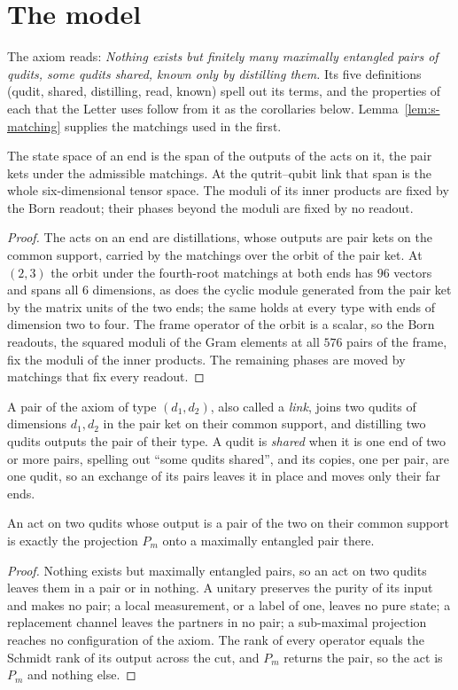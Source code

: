 \section{The model}
\label{sec:s-model}

The axiom reads: \textit{Nothing exists but finitely many maximally entangled pairs of qudits, some qudits shared, known only by distilling them.} Its five definitions (qudit, shared, distilling, read, known) spell out its terms, and the properties of each that the Letter uses follow from it as the corollaries below. Lemma~\ref{lem:s-matching} supplies the matchings used in the first.

\begin{corollary}[A qudit]
\label{cor:s-qudit}
The state space of an end is the span of the outputs of the acts on it, the pair kets under the admissible matchings. At the qutrit--qubit link that span is the whole six-dimensional tensor space. The moduli of its inner products are fixed by the Born readout; their phases beyond the moduli are fixed by no readout.
\end{corollary}
\begin{proof}
The acts on an end are distillations, whose outputs are pair kets on the common support, carried by the matchings over the orbit of the pair ket. At $(2,3)$ the orbit under the fourth-root matchings at both ends has $96$ vectors and spans all $6$ dimensions, as does the cyclic module generated from the pair ket by the matrix units of the two ends; the same holds at every type with ends of dimension two to four. The frame operator of the orbit is a scalar, so the Born readouts, the squared moduli of the Gram elements at all $576$ pairs of the frame, fix the moduli of the inner products. The remaining phases are moved by matchings that fix every readout.
\end{proof}

A pair of the axiom of type $(d_{1},d_{2})$, also called a \emph{link}, joins two qudits of dimensions $d_{1},d_{2}$ in the pair ket on their common support, and distilling two qudits outputs the pair of their type. A qudit is \emph{shared} when it is one end of two or more pairs, spelling out ``some qudits shared'', and its copies, one per pair, are one qudit, so an exchange of its pairs leaves it in place and moves only their far ends.

\begin{corollary}[Distilling]
\label{cor:s-distill}
An act on two qudits whose output is a pair of the two on their common support is exactly the projection $P_{m}$ onto a maximally entangled pair there.
\end{corollary}
\begin{proof}
Nothing exists but maximally entangled pairs, so an act on two qudits leaves them in a pair or in nothing. A unitary preserves the purity of its input and makes no pair; a local measurement, or a label of one, leaves no pure state; a replacement channel leaves the partners in no pair; a sub-maximal projection reaches no configuration of the axiom. The rank of every operator equals the Schmidt rank of its output across the cut, and $P_{m}$ returns the pair, so the act is $P_{m}$ and nothing else.
\end{proof}

